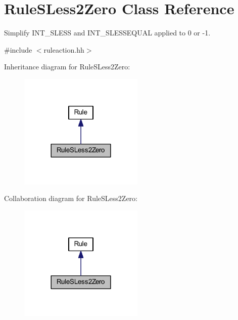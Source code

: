 \hypertarget{class_rule_s_less2_zero}{}\section{Rule\+S\+Less2\+Zero Class Reference}
\label{class_rule_s_less2_zero}


Simplify I\+N\+T\+\_\+\+S\+L\+E\+SS and I\+N\+T\+\_\+\+S\+L\+E\+S\+S\+E\+Q\+U\+AL applied to 0 or -\/1.  




{\ttfamily \#include $<$ruleaction.\+hh$>$}



Inheritance diagram for Rule\+S\+Less2\+Zero\+:
\nopagebreak
\begin{figure}[H]
\begin{center}
\leavevmode
\includegraphics[width=168pt]{class_rule_s_less2_zero__inherit__graph}
\end{center}
\end{figure}


Collaboration diagram for Rule\+S\+Less2\+Zero\+:
\nopagebreak
\begin{figure}[H]
\begin{center}
\leavevmode
\includegraphics[width=168pt]{class_rule_s_less2_zero__coll__graph}
\end{center}
\end{figure}
